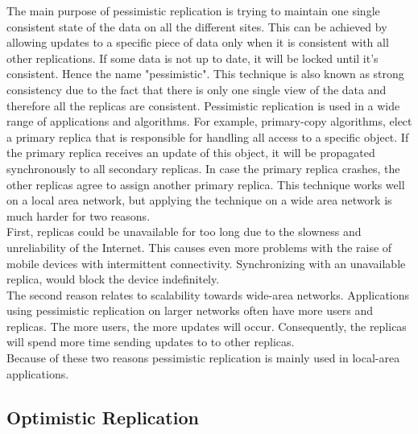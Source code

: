\documentclass[a4paper,12pt]{report}
\begin{document}
The main purpose of pessimistic replication is trying to maintain one single consistent state of the data on all the different sites. This can be achieved by allowing updates to a specific piece of data only when it is consistent with all other replications. If some data is not up to date, it will be locked until it's consistent. Hence the name "pessimistic". This technique is also known as strong consistency due to the fact that there is only one single view of the data and therefore all the replicas are consistent. Pessimistic replication is used in a wide range of applications and algorithms. For example, primary-copy algorithms, elect a primary replica that is responsible for handling all access to a specific object. If the primary replica receives an update of this object, it will be propagated synchronously to all secondary replicas. In case the primary replica crashes, the other replicas agree to assign another primary replica. This technique works well on a local area network, but applying the technique on a wide area network is much harder for two reasons. \\
\indent First, replicas could be unavailable for too long due to the slowness and unreliability of the Internet. This causes even more problems with the raise of mobile devices with intermittent connectivity. Synchronizing with an unavailable replica, would block the device indefinitely. \\
\indent The second reason relates to scalability towards wide-area networks. Applications using pessimistic replication on larger networks often have more users and replicas. The more users, the more updates will occur. Consequently, the replicas will spend more time sending updates to to other replicas. \\
Because of these two reasons pessimistic replication is mainly used in local-area applications. 

\subsection{Optimistic Replication}\label{sec:OptimisticReplication}
\end{document}
